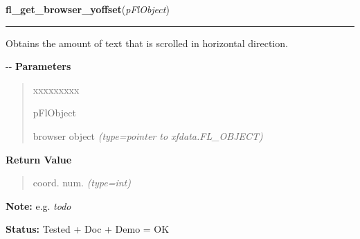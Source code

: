 \hspace{.8\funcindent}\begin{boxedminipage}{\funcwidth}

    \raggedright \textbf{fl\_get\_browser\_yoffset}(\textit{pFlObject})

    \vspace{-1.5ex}

    \rule{\textwidth}{0.5\fboxrule}
\setlength{\parskip}{2ex}

Obtains the amount of text that is scrolled in horizontal direction.

-{}-
\setlength{\parskip}{1ex}
      \textbf{Parameters}
      \vspace{-1ex}

      \begin{quote}
        \begin{Ventry}{xxxxxxxxx}

          \item[pFlObject]


browser object
            {\it (type=pointer to xfdata.FL\_OBJECT)}

        \end{Ventry}

      \end{quote}

      \textbf{Return Value}
    \vspace{-1ex}

      \begin{quote}

coord. num.
      {\it (type=int)}

      \end{quote}

\textbf{Note:} 
e.g. \emph{todo}


\textbf{Status:} 
Tested + Doc + Demo = OK


    \end{boxedminipage}

    \label{xformslib:flbrowser:fl_get_browser_rel_yoffset}

    \vspace{0.5ex}

